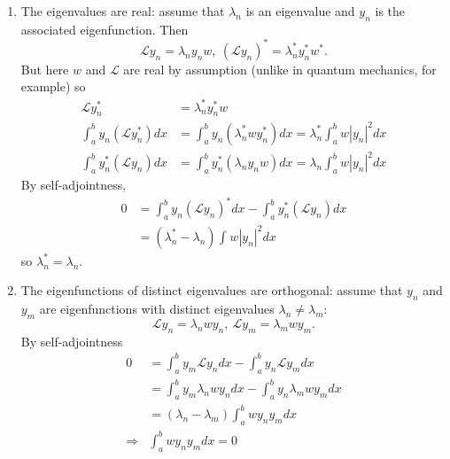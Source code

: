 \documentclass[a4paper]{article}
\renewcommand*{\L}{\mathcal{L}}
\begin{document}
\begin{enumerate}
\item The eigenvalues are real: assume that \(\lambda_n\) is an eigenvalue and \(y_n\) is the associated eigenfunction. Then
  \[
\L y_n = \lambda_ny_n w, \: (\L y_n)^* = \lambda_n^*y_n^*w^*.
  \]
  But here \(w\) and \(\L\) are real by assumption (unlike in quantum mechanics, for example) so
  \begin{align*}
    \L y_n^* &= \lambda_n^* y_n^* w \\
    \int_{a}^{b} y_n(\L y_n^*) dx &=  \int_{a}^{b} y_n(\lambda_n^*wy_n^*) dx = \lambda_n^* \int_{a}^{b} w |y_n|^2 dx \\
    \int_{a}^{b} y_n^* (\L y_n) dx &= \int_{a}^{b} y_n^*(\lambda_ny_nw) dx = \lambda_n \int_{a}^{b} w |y_n|^2 dx
  \end{align*}
  By self-adjointness,
  \begin{align*}
    0 &= \int_{a}^{b} y_n (\L y_n)^* dx - \int_{a}^{b} y_n^* (\L y_n) dx \\
      &= (\lambda_n^* - \lambda_n) \int_{ }^{ } w |y_n|^2 dx
  \end{align*}
  so \(\lambda_n^* = \lambda_n\).
\item The eigenfunctions of distinct eigenvalues are orthogonal: assume that \(y_n\) and \(y_m\) are eigenfunctions with distinct eigenvalues \(\lambda_n \neq \lambda_m\):
  \[
\L y_n = \lambda_n w y_n, \: \L y_m = \lambda_m wy_m.
\]
By self-adjointness
\begin{align*}
  0 &= \int_{a}^{b} y_m\L y_n dx - \int_{a}^{b} y_n\L y_m dx \\
    &= \int_{a}^{b} y_m \lambda_nwy_n dx - \int_{a}^{b} y_n\lambda_mwy_m dx \\
    &= (\lambda_n - \lambda_m) \int_{a}^{b} wy_ny_m dx \\
  \Rightarrow &\int_{a}^{b} wy_ny_m dx = 0
\end{align*}


\end{enumerate}
\end{document}
